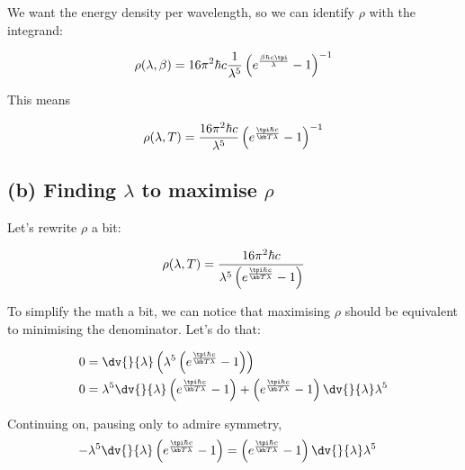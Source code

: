 \documentclass[../../PS3.tex]{subfiles}
\begin{document}
We want the energy density per wavelength, so we can identify $\rho$ with the integrand:

\begin{equation}
	\rho(\lambda,\beta) = 16 \pi^2 \hbar c \frac{1}{\lambda^5} \left(e^{ \frac{\beta \hbar c \tpi}{\lambda}} - 1\right)^{-1}
\end{equation}

This means 

\begin{equation}
	\rho(\lambda,T) =  \frac{16 \pi^2 \hbar c}{\lambda^5} \left(e^{ \frac{\tpi \hbar c }{\kb T \lambda}} - 1\right)^{-1}
\end{equation}

\subsection*{(b) Finding $\lambda$ to maximise $\rho$}

Let's rewrite $\rho$ a bit:

\begin{equation}
	\rho(\lambda,T) =  \frac{16 \pi^2 \hbar c}{\lambda^5 \left(e^{ \frac{\tpi \hbar c }{\kb T \lambda}} - 1\right)}
\end{equation}

To simplify the math a bit, we can notice that maximising $\rho$ should be equivalent to minimising the denominator. Let's do that:

\begin{align}
	0 &= \dv{}{\lambda} \left( \lambda^5 \left(e^{ \frac{\tpi \hbar c }{\kb T \lambda}} - 1\right)\right) \\
	0 &= \lambda^5 \dv{}{\lambda} \left(e^{ \frac{\tpi \hbar c }{\kb T \lambda}} - 1\right) + \left(e^{ \frac{\tpi \hbar c }{\kb T \lambda}} - 1\right)\dv{}{\lambda} \lambda^5 
\end{align}

Continuing on, pausing only to admire symmetry,
\begin{align}
	- \lambda^5 \dv{}{\lambda} \left(e^{ \frac{\tpi \hbar c }{\kb T \lambda}} - 1\right) &= \left(e^{ \frac{\tpi \hbar c }{\kb T \lambda}} - 1\right)\dv{}{\lambda} \lambda^5 
\end{align}
\end{document}

